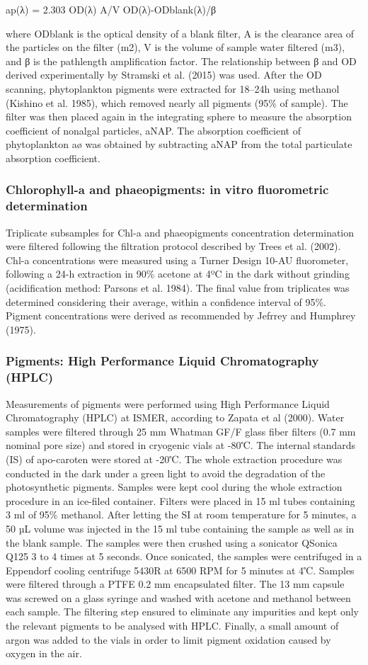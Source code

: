 \documentclass[essd, manuscript]{copernicus}
\begin{document}
ap(λ) = 2.303 OD(λ) A/V OD(λ)-ODblank(λ)/β

where ODblank is the optical density of a blank filter, A is the clearance area of the particles on the filter (m2), V is the volume of sample water filtered (m3), and β is the pathlength amplification factor. The relationship between β and OD derived experimentally by Stramski et al. (2015) was used. After the OD scanning, phytoplankton pigments were extracted for 18–24h using methanol (Kishino et al. 1985), which removed nearly all pigments (95\% of sample). The filter was then placed again in the integrating sphere to measure the absorption coefficient of nonalgal particles, aNAP. The absorption coefficient of phytoplankton aø was obtained by subtracting aNAP from the total particulate absorption coefficient.

\subsubsection{ Chlorophyll-a and phaeopigments: in vitro fluorometric determination}
Triplicate subsamples for Chl-a and phaeopigments concentration determination were filtered following the filtration protocol described by Trees et al. (2002). Chl-a concentrations were measured using a Turner Design 10-AU fluorometer, following a 24-h extraction in 90\% acetone at 4ºC in the dark without grinding (acidification method: Parsons et al. 1984). The final value from triplicates was determined considering their average, within a confidence interval of 95\%. Pigment concentrations were derived as recommended by Jefrrey and Humphrey (1975).

\subsubsection{Pigments: High Performance Liquid Chromatography (HPLC)}
Measurements of pigments were performed using High Performance Liquid Chromatography (HPLC) at ISMER, according to Zapata et al (2000). Water samples were filtered through 25 mm Whatman GF/F glass fiber filters (0.7 mm nominal pore size) and stored in cryogenic vials at -80℃. The internal standards (IS) of apo-caroten were stored at -20℃. The whole extraction procedure was conducted in the dark under a green light to avoid the degradation of the photosynthetic pigments. Samples were kept cool during the whole extraction procedure in an ice-filed container. Filters were placed in 15 ml tubes containing 3 ml of 95\% methanol. After letting the SI at room temperature for 5 minutes, a 50 µL volume was injected in the 15 ml tube containing the sample as well as in the blank sample. The samples were then crushed using a sonicator QSonica Q125 3 to 4 times at 5 seconds.  Once sonicated, the samples were centrifuged in a Eppendorf cooling centrifuge 5430R at 6500 RPM for 5 minutes at 4℃. Samples were filtered through a PTFE 0.2 mm encapsulated filter. The 13 mm capsule was screwed on a glass syringe and washed with acetone and methanol between each sample. The filtering step ensured to eliminate any impurities and kept only the relevant pigments to be analysed with HPLC. Finally, a small amount of argon was added to the vials in order to limit pigment oxidation caused by oxygen in the air.
 
\end{document}
